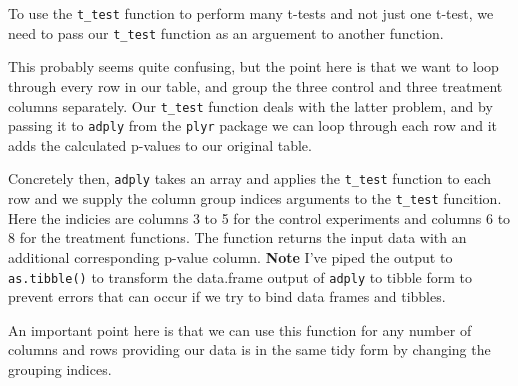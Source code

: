 \documentclass[12pt,]{book}
\newenvironment{Shaded}{\begin{snugshade}}{\end{snugshade}}
\newcommand{\KeywordTok}[1]{\textcolor[rgb]{0.13,0.29,0.53}{\textbf{#1}}}
\newcommand{\DataTypeTok}[1]{\textcolor[rgb]{0.13,0.29,0.53}{#1}}
\newcommand{\StringTok}[1]{\textcolor[rgb]{0.31,0.60,0.02}{#1}}
\newcommand{\CommentTok}[1]{\textcolor[rgb]{0.56,0.35,0.01}{\textit{#1}}}
\newcommand{\ControlFlowTok}[1]{\textcolor[rgb]{0.13,0.29,0.53}{\textbf{#1}}}
\newcommand{\OperatorTok}[1]{\textcolor[rgb]{0.81,0.36,0.00}{\textbf{#1}}}
\newcommand{\NormalTok}[1]{#1}
\theoremstyle{definition}
\theoremstyle{definition}
\theoremstyle{definition}
\theoremstyle{remark}
\begin{document}
\begin{Shaded}
\end{Shaded}

To use the \texttt{t\_test} function to perform many t-tests and not
just one t-test, we need to pass our \texttt{t\_test} function as an
arguement to another function.

This probably seems quite confusing, but the point here is that we want
to loop through every row in our table, and group the three control and
three treatment columns separately. Our \texttt{t\_test} function deals
with the latter problem, and by passing it to \texttt{adply} from the
\texttt{plyr} package we can loop through each row and it adds the
calculated p-values to our original table.

Concretely then, \texttt{adply} takes an array and applies the
\texttt{t\_test} function to each row and we supply the column group
indices arguments to the \texttt{t\_test} funcition. Here the indicies
are columns 3 to 5 for the control experiments and columns 6 to 8 for
the treatment functions. The function returns the input data with an
additional corresponding p-value column. \textbf{Note} I've piped the
output to \texttt{as.tibble()} to transform the data.frame output of
\texttt{adply} to tibble form to prevent errors that can occur if we try
to bind data frames and tibbles.

An important point here is that we can use this function for any number
of columns and rows providing our data is in the same tidy form by
changing the grouping indices.
\end{document}
